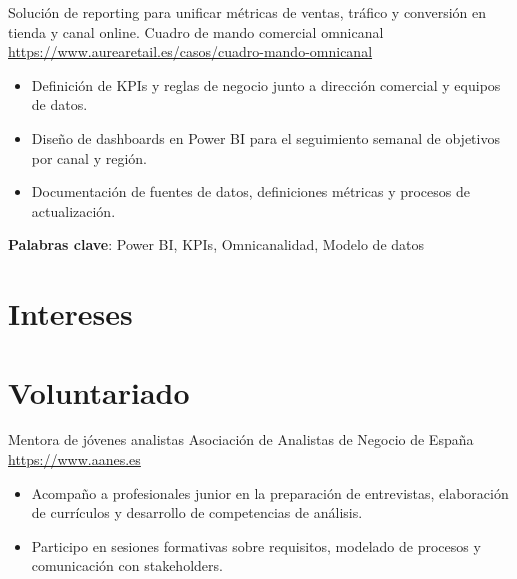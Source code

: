 \documentclass[a4paper, serif, 10pt]{moderncv}
\begin{document}
        {Solución de reporting para unificar métricas de ventas, tráfico y conversión en tienda y canal online.}
        {Cuadro de mando comercial omnicanal}
        {\url{https://www.aurearetail.es/casos/cuadro-mando-omnicanal}}
        {}
        {\begin{itemize}
\item Definición de KPIs y reglas de negocio junto a dirección comercial y equipos de datos.
\item Diseño de dashboards en Power BI para el seguimiento semanal de objetivos por canal y región.
\item Documentación de fuentes de datos, definiciones métricas y procesos de actualización.
\end{itemize}
\textbf{Palabras clave}: Power BI, KPIs, Omnicanalidad, Modelo de datos}
\section{Intereses}

\section{Voluntariado}

        {Mentora de jóvenes analistas}
        {Asociación de Analistas de Negocio de España}
        {\url{https://www.aanes.es}}
        {}
        {\begin{itemize}
\item Acompaño a profesionales junior en la preparación de entrevistas, elaboración de currículos y desarrollo de competencias de análisis.
\item Participo en sesiones formativas sobre requisitos, modelado de procesos y comunicación con stakeholders.
\end{itemize}}
    
\end{document}
